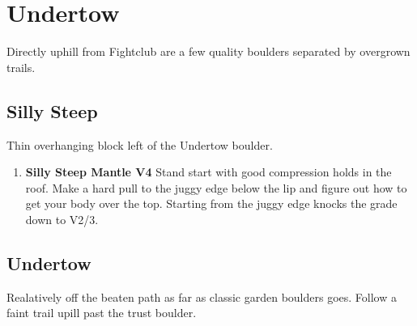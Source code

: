 \section{Undertow}\label{sa:Undertow}
Directly uphill from Fightclub are a few quality boulders separated by overgrown trails.
\subsection*{Silly Steep}\label{bf:Silly Steep}
Thin overhanging block left of the Undertow boulder.

\begin{enumerate}[]
	\setcounter{enumi}{0}
	\item\label{rt:Silly Steep Mantle} \colorbox{RoyalBlue!20}{\textbf{Silly Steep Mantle V4    } }
	\newline Stand start with good compression holds in the roof. Make a hard pull to the juggy edge below the lip and figure out how to get your body over the top. Starting from the juggy edge knocks the grade down to V2/3.\
\end{enumerate}
\subsection*{Undertow}\label{bf:Undertow}
Realatively off the beaten path as far as classic garden boulders goes. Follow a faint trail upill past the trust boulder.


